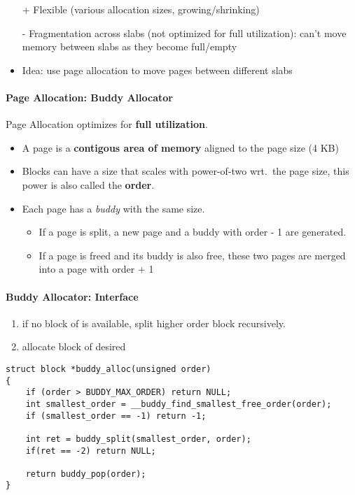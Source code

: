 \begin{itemize}
    \item[+] Flexible (various allocation sizes, growing/shrinking)
    \item[-] Fragmentation across slabs (not optimized for full utilization): can't move memory between slabs as they become full/empty
    \item Idea: use page allocation to move pages between different slabs
\end{itemize}
\paragraph{Page Allocation: Buddy Allocator}
Page Allocation optimizes for \textbf{full utilization}.
\begin{itemize}
    \item A page is a \textbf{contigous area of memory} aligned to the page size (4 KB)
    \item Blocks can have a size that scales with power-of-two wrt.\ the page size, this power is also called the \textbf{order}.
    \item Each page has a \textit{buddy} with the same size.
          \begin{itemize}
              \item If a page is split, a new page and a buddy with order - 1 are generated.
              \item If a page is freed and its buddy is also free, these two pages are merged into a page with order + 1
          \end{itemize}
\end{itemize}

\paragraph{Buddy Allocator: Interface}
\begin{enumerate}
    \item if no block of  is available, split higher order block recursively.
    \item allocate block of desired 
\end{enumerate}

\begin{lstlisting}[style=bright_C++]
struct block *buddy_alloc(unsigned order)
{
    if (order > BUDDY_MAX_ORDER) return NULL;
    int smallest_order = __buddy_find_smallest_free_order(order);
    if (smallest_order == -1) return -1;

    int ret = buddy_split(smallest_order, order);
    if(ret == -2) return NULL;

    return buddy_pop(order);
}
\end{lstlisting}

